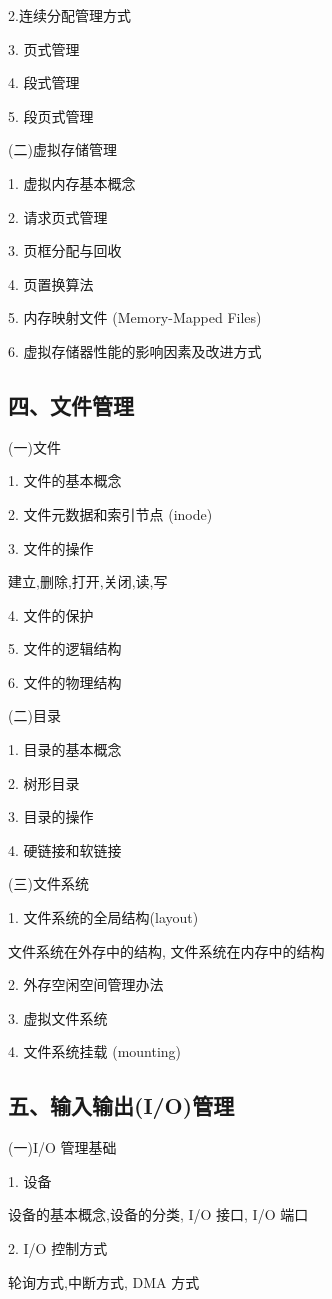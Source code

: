 \documentclass[10pt]{article}
\begin{document}
2.连续分配管理方式

3. 页式管理

4. 段式管理

5. 段页式管理

(二)虚拟存储管理

1. 虚拟内存基本概念

2. 请求页式管理

3. 页框分配与回收

4. 页置换算法

5. 内存映射文件 (Memory-Mapped Files)

6. 虚拟存储器性能的影响因素及改进方式

\subsection*{四、文件管理}

(一)文件

1. 文件的基本概念

2. 文件元数据和索引节点 (inode)

3. 文件的操作

建立,删除,打开,关闭,读,写

4. 文件的保护

5. 文件的逻辑结构

6. 文件的物理结构

(二)目录

1. 目录的基本概念

2. 树形目录

3. 目录的操作

4. 硬链接和软链接

(三)文件系统

1. 文件系统的全局结构(layout)

文件系统在外存中的结构, 文件系统在内存中的结构

2. 外存空闲空间管理办法

3. 虚拟文件系统

4. 文件系统挂载 (mounting)

\subsection*{五、输入输出(I/O)管理}

(一)I/O 管理基础

1. 设备

设备的基本概念,设备的分类, I/O 接口, I/O 端口

2. I/O 控制方式

轮询方式,中断方式, DMA 方式
\end{document}
